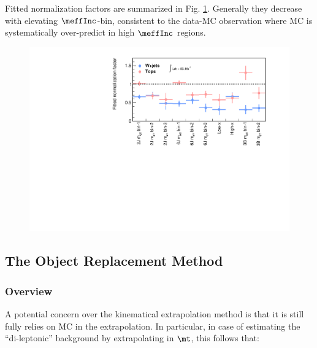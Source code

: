 Fitted normalization factors are summarized in Fig. \ref{fig::BGestimation::fittedSFs}. Generally they decrease with elevating $\meffInc$-bin, consistent to the data-MC observation where MC is systematically over-predict in high $\meffInc$ regions.
 
\begin{figure}[h]
  \begin{center}
    \includegraphics[width=160mm]{figures/BGestimation/fittedSFs/SFs.pdf}
    \label{fig::BGestimation::fittedSFs}
  \end{center}
\end{figure}

\clearpage

\clearpage


\subsection{The Object Replacement Method}
\subsubsection{Overview}
A potential concern over the kinematical extrapolation method is that it is still fully relies on MC in the extrapolation. In particular, in case of estimating the ``di-leptonic'' background by extrapolating in $\mt$, this follows that:

